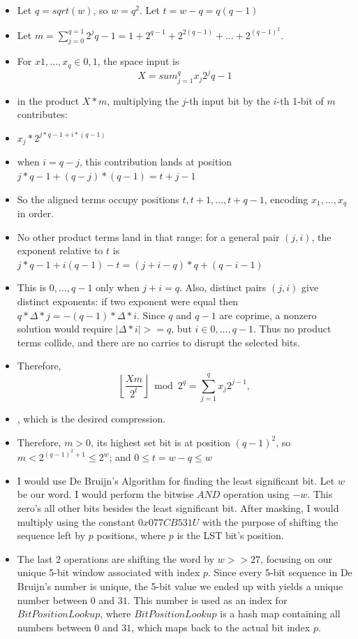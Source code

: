 \documentclass{article}
\begin{document}
\begin{itemize}
    \item[2] Let $q = sqrt(w)$, so $w = q^2$. Let $t = w - q = q(q-1)$
    \item Let $m = \sum_{j = 0}^{q = 1} 2^j{q-1} = 1 + 2^{q-1} + 2^{2(q-1)} + \ldots + 2^{(q-1)^2}$.
    \item For $x1,\ldots,x_q \in {0,1}$, the space input is
    \[
        X = sum_{j = 1}^{q}x_j2^jq-1
    \]
    \item in the product $X*m$, multiplying the $j$-th input bit by the $i$-th 1-bit of $m$ contributes:
    \item $x_j * 2^{j*q - 1 + i*(q-1)}$
    \item when $i = q - j$, this contribution lands at position $j * q - 1 + (q - j)*(q - 1) = t + j - 1$
    \item So the aligned terms occupy positions $t, t+1, \ldots, t + q - 1$, encoding $x_1,\ldots,x_q$ in order.
    \item No other product terms land in that range: for a general pair $(j,i)$, the exponent relative to $t$ is $j*q - 1 + i(q-1) - t = (j + i - q)*q + (q - i - 1)$
    \item This is $ {0, \ldots, q-1}$ only when $j + i = q$. Also, distinct pairs $(j,i)$ give distinct exponents: if two exponent were equal then $q*\Delta*j = -(q-1)*\Delta*i$. Since $q$ and $q-1$ are coprime, a nonzero solution would require $|\Delta*i| >= q$, but $i \in {0, \ldots, q-1}$. Thus no product terms collide, and there are no carries to disrupt the selected bits.
    \item Therefore, 
    \[
        \left\lfloor\frac{Xm}{2^t}\right\rfloor\bmod 2^q=\sum_{j=1}^{q}x_j2^{j-1},
    \]
    \item, which is the desired compression.
    \item Therefore, $m > 0$, its highest set bit is at position $(q-1)^2$, so $m < 2^{(q-1)^2 + 1} \le 2^w$; and $ 0\le t = w - q \le w$
    \item [3] I would use De Bruijn's Algorithm for finding the least significant bit. Let $w$ be our word. I would perform the bitwise $AND$ operation using $-w$. This zero's all other bits besides the least significant bit. After masking, I would multiply using the constant $0x077CB531U$ with the purpose of shifting the sequence left by $p$ positions, where $p$ is the LST bit's position.
    \item The last 2 operations are shifting the word by $w >> 27$, focusing on our unique 5-bit window associated with index $p$. Since every 5-bit sequence in De Bruijn's number is unique, the 5-bit value we ended up with yields a unique number between $0$ and $31$. This number is used as an index for $BitPositionLookup$, where $BitPositionLookup$ is a hash map containing all numbers between $0$ and $31$, which maps back to the actual bit index $p$.
\end{itemize}
\end{document}
